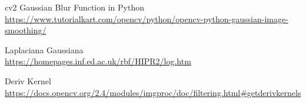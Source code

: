 \documentclass{article}
\begin{document}
\newpage

\begin{thebibliography}{9}
	cv2 Gaussian Blur Function in Python \\
	\url{https://www.tutorialkart.com/opencv/python/opencv-python-gaussian-image-smoothing/}
	
	Laplaciana Gaussiana\\
	\url{https://homepages.inf.ed.ac.uk/rbf/HIPR2/log.htm}
	
	Deriv Kernel \\
	\url{https://docs.opencv.org/2.4/modules/imgproc/doc/filtering.html#getderivkernels}
	
\end{thebibliography}
\end{document}

